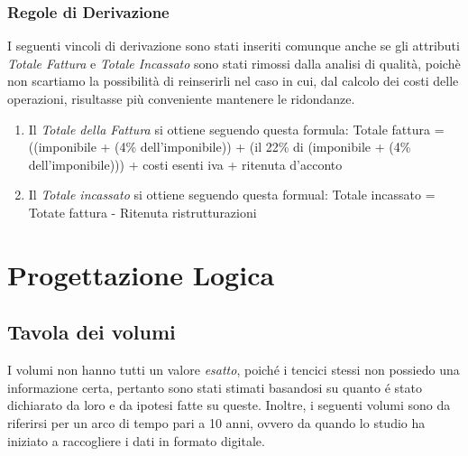 \documentclass{elegantbook}
\begin{document}
        \subsection{Regole di Derivazione}
        \label{subsec:derivazioni}
        I seguenti vincoli di derivazione sono stati inseriti comunque anche se gli attributi \textit{Totale Fattura} e \textit{Totale Incassato} sono stati rimossi dalla analisi di qualità, poichè non scartiamo la possibilità
        di reinserirli nel caso in cui, dal calcolo dei costi delle operazioni, risultasse più conveniente mantenere le ridondanze.
        \begin{enumerate}[label=RD\arabic*]
            \item Il \textit{Totale della Fattura} si ottiene seguendo questa formula: Totale fattura = ((imponibile + (4\% dell'imponibile)) + (il 22\% di (imponibile + (4\% dell'imponibile))) + costi esenti iva + ritenuta d'acconto
            \item Il \textit{Totale incassato} si ottiene seguendo questa formual: Totale incassato = Totate fattura - Ritenuta ristrutturazioni
        \end{enumerate}
	\chapter{Progettazione Logica}
	\section{Tavola dei volumi}
        I volumi non hanno tutti un valore \textit{esatto}, poiché i tencici stessi non possiedo una
        informazione certa, pertanto sono stati stimati basandosi su quanto é stato dichiarato da loro e da ipotesi fatte su queste.
        Inoltre, i seguenti volumi sono da riferirsi per un arco di tempo pari a 10 anni, ovvero da quando lo studio ha iniziato a raccogliere i dati in formato digitale.
\end{document}
